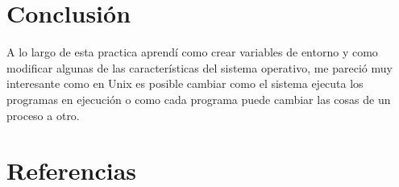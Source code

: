 \documentclass[11pt]{article}
\begin{document}
\section{Conclusión}
\label{sec:orge121450}
A lo largo de esta practica aprendí como crear variables de entorno y como 
modificar algunas de las características del sistema operativo, me pareció 
muy interesante como en Unix es posible cambiar como el sistema ejecuta los
programas en ejecución o como cada programa puede cambiar las cosas de un 
proceso a otro. 

\pagebreak

\section{Referencias}
\label{sec:org9b1d6b3}
\printbibliography[heading=none]
\end{document}
